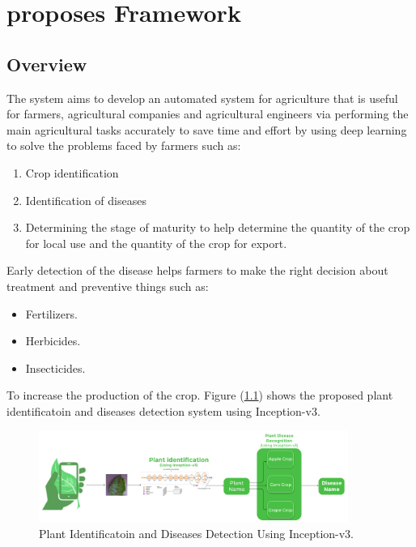 \chapter{proposes Framework}

\section{Overview}

The system aims to develop an automated system for agriculture 
that is useful for farmers, agricultural companies and agricultural 
engineers via performing the main agricultural tasks accurately to 
save time and effort by using deep learning to solve the problems 
faced by farmers such as:
\begin{enumerate}
    \item Crop identification
    \item Identification of diseases
    \item Determining the stage of maturity to help determine the quantity 
        of the crop for local use and the quantity of the crop for export.
\end{enumerate}
Early detection of the disease helps farmers to make the right 
decision about treatment and preventive things such as:
\begin{itemize}
    \item Fertilizers.
    \item Herbicides.
    \item Insecticides.
\end{itemize}
To increase the production of the crop. Figure (\ref{fig:plantIdDis}) shows 
the proposed plant identificatoin and diseases detection system using Inception-v3.
\begin{figure}[H]
    \centering
    \includegraphics[width=0.9\textwidth]{photos/chapter04/1.png}
    \caption{Plant Identificatoin and Diseases Detection Using Inception-v3.}
    \label{fig:plantIdDis}
\end{figure}

